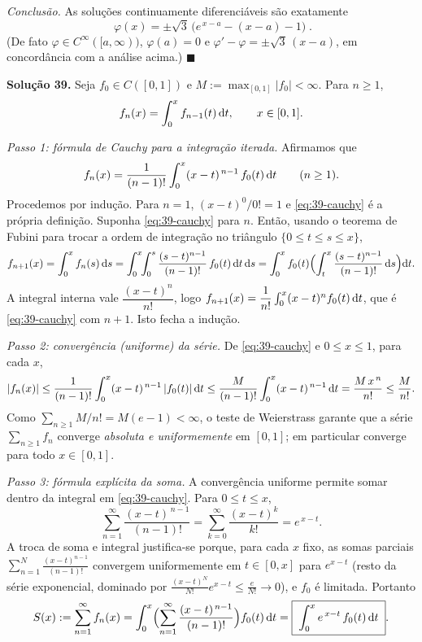 \emph{Conclusão.} As soluções continuamente diferenciáveis são exatamente
\[
\boxed{\;\varphi(x)=\pm\sqrt3\,\bigl(e^{\,x-a}-(x-a)-1\bigr)\;}.
\]
(De fato $\varphi\in C^\infty([a,\infty))$, $\varphi(a)=0$ e $\varphi'-\varphi=\pm\sqrt3\,(x-a)$, em concordância com a análise acima.) \qquad$\blacksquare$


\bigskip\noindent\textbf{Solução 39.}\quad
Seja $f_0\in C([0,1])$ e $M:=\max_{[0,1]}|f_0|<\infty$. Para $n\ge1$,
\[
f_n(x)=\int_0^x f_{n-1}(t)\,\mathrm{d} t,\qquad x\in[0,1].
\]

\emph{Passo 1: fórmula de Cauchy para a integração iterada.}
Afirmamos que
\begin{equation}\label{eq:39-cauchy}
f_n(x)=\frac{1}{(n-1)!}\int_0^x (x-t)^{\,n-1}\,f_0(t)\,\mathrm{d} t\qquad(n\ge1).
\end{equation}
Procedemos por indução. Para $n=1$, $(x-t)^0/0!=1$ e \eqref{eq:39-cauchy} é a própria definição. Suponha \eqref{eq:39-cauchy} para $n$. Então, usando o teorema de Fubini para trocar a ordem de integração no triângulo $\{0\le t\le s\le x\}$,
\[
f_{n+1}(x)=\int_0^x f_n(s)\,\mathrm{d} s
=\int_0^x\!\!\int_0^s \frac{(s-t)^{n-1}}{(n-1)!}\,f_0(t)\,\mathrm{d} t\,\mathrm{d} s
=\int_0^x f_0(t)\Bigl(\int_t^x\frac{(s-t)^{n-1}}{(n-1)!}\,\mathrm{d} s\Bigr)\mathrm{d} t.
\]
A integral interna vale $\dfrac{(x-t)^{n}}{n!}$, logo $f_{n+1}(x)=\dfrac{1}{n!}\int_0^x(x-t)^{n}f_0(t)\,\mathrm{d} t$, que é \eqref{eq:39-cauchy} com $n+1$. Isto fecha a indução.

\emph{Passo 2: convergência (uniforme) da série.}
De \eqref{eq:39-cauchy} e $0\le x\le1$, para cada $x$,
\[
|f_n(x)|\le \frac{1}{(n-1)!}\int_0^x (x-t)^{\,n-1}\,|f_0(t)|\,\mathrm{d} t
\le \frac{M}{(n-1)!}\int_0^x (x-t)^{\,n-1}\,\mathrm{d} t
=\frac{M\,x^{\,n}}{n!}\le \frac{M}{n!}.
\]
Como $\sum_{n\ge1}M/n!=M(e-1)<\infty$, o teste de Weierstrass garante que a série $\sum_{n\ge1}f_n$ converge \emph{absoluta e uniformemente} em $[0,1]$; em particular converge para todo $x\in[0,1]$.

\emph{Passo 3: fórmula explícita da soma.}
A convergência uniforme permite somar dentro da integral em \eqref{eq:39-cauchy}. Para $0\le t\le x$,
\[
\sum_{n=1}^{\infty}\frac{(x-t)^{\,n-1}}{(n-1)!}=\sum_{k=0}^{\infty}\frac{(x-t)^{k}}{k!}=e^{\,x-t}.
\]
A troca de soma e integral justifica-se porque, para cada $x$ fixo, as somas parciais $\sum_{n=1}^{N}\frac{(x-t)^{n-1}}{(n-1)!}$ convergem uniformemente em $t\in[0,x]$ para $e^{x-t}$ (resto da série exponencial, dominado por $\frac{(x-t)^N}{N!}e^{x-t}\le \frac{e}{N!}\to0$), e $f_0$ é limitada. Portanto
\[
S(x):=\sum_{n=1}^{\infty}f_n(x)
=\int_0^x\Bigl(\sum_{n=1}^{\infty}\frac{(x-t)^{\,n-1}}{(n-1)!}\Bigr)f_0(t)\,\mathrm{d} t
=\boxed{\;\int_0^x e^{\,x-t}\,f_0(t)\,\mathrm{d} t\;}.
\]


